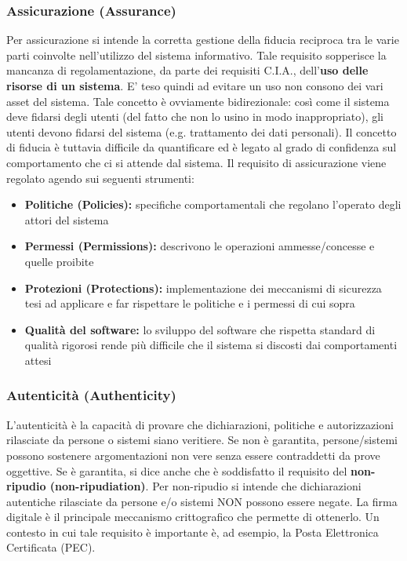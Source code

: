 \subsubsection{Assicurazione (Assurance)}
Per assicurazione si intende la corretta gestione della fiducia reciproca tra le varie parti coinvolte nell'utilizzo del sistema informativo. Tale requisito sopperisce la mancanza di regolamentazione, da parte dei requisiti C.I.A., dell'\textbf{uso delle risorse di un sistema}. E' teso quindi ad evitare un uso non consono dei vari asset del sistema. Tale concetto è ovviamente bidirezionale: così come il sistema deve fidarsi degli utenti (del fatto che non lo usino in modo inappropriato), gli utenti devono fidarsi del sistema (e.g. trattamento dei dati personali). Il concetto di fiducia è tuttavia difficile da quantificare ed è legato al grado di confidenza sul comportamento che ci si attende dal sistema. Il requisito di assicurazione viene regolato agendo sui seguenti strumenti:
\begin{itemize} 
  \item \textbf{Politiche (Policies):} specifiche comportamentali che regolano l’operato degli attori del sistema
  \item \textbf{Permessi (Permissions):} descrivono le operazioni ammesse/concesse e quelle proibite
  \item \textbf{Protezioni (Protections):} implementazione dei meccanismi di sicurezza tesi ad applicare e far rispettare le politiche e i permessi di cui sopra
  \item \textbf{Qualità del software:} lo sviluppo del software che rispetta standard di qualità rigorosi rende più difficile che il sistema si discosti dai comportamenti attesi 
\end{itemize}

\subsubsection{Autenticità (Authenticity)}
L'autenticità è la capacità di provare che dichiarazioni, politiche e autorizzazioni rilasciate da persone o sistemi siano veritiere. Se non è garantita, persone/sistemi possono sostenere argomentazioni non vere senza essere contraddetti da prove oggettive. Se è garantita, si dice anche che è soddisfatto il requisito del \textbf{non-ripudio (non-ripudiation)}. Per non-ripudio si intende che dichiarazioni autentiche rilasciate da persone e/o sistemi NON possono essere negate. La firma digitale è il principale meccanismo crittografico che permette di ottenerlo. Un contesto in cui tale requisito è importante è, ad esempio, la Posta Elettronica Certificata (PEC).

